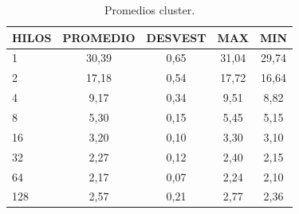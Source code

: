 \documentclass[a4paper]{article}
\begin{document}
\begin{table}[H]
\centering
\begin{tabular}{lcccc}
\textbf{HILOS} & \textbf{PROMEDIO} & \textbf{DESVEST} & \textbf{MAX} & \textbf{MIN} \\ \hline
1              & 30,39             & 0,65             & 31,04        & 29,74        \\
2              & 17,18             & 0,54             & 17,72        & 16,64        \\
4              & 9,17              & 0,34             & 9,51         & 8,82         \\
8              & 5,30              & 0,15             & 5,45         & 5,15         \\
16             & 3,20              & 0,10             & 3,30         & 3,10         \\
32             & 2,27              & 0,12             & 2,40         & 2,15         \\
64             & 2,17              & 0,07             & 2,24         & 2,10         \\
128            & 2,57              & 0,21             & 2,77         & 2,36        
\end{tabular}
\caption{Promedios cluster.}
\label{tab:promcluster}
\end{table}
\end{document}
